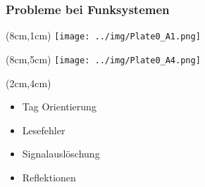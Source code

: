 \begin{frame} %
  	\frametitle{Probleme bei Funksystemen}
	\begin{textblock*}{4cm}(8cm,1cm) %
		\centering
  		\texttt{[image: ../img/Plate0\_A1.png]}
  	\end{textblock*}
%  	
	\begin{textblock*}{4cm}(8cm,5cm) %
		\centering
  		\texttt{[image: ../img/Plate0\_A4.png]}
  	\end{textblock*}
%  	
	\begin{textblock*}{4cm}(2cm,4cm) %
  			\begin{itemize}
  				\item Tag Orientierung
  				\item Lesefehler
   				\item Signalauslöschung
   				\item Reflektionen
  		  	\end{itemize}
  	\end{textblock*}
\end{frame}
